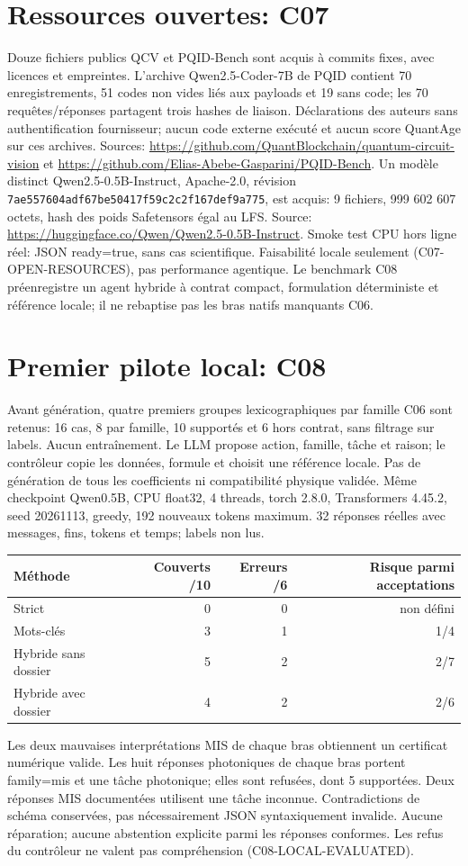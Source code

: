 \documentclass{article}
\begin{document}
\section{Ressources ouvertes: C07}
Douze fichiers publics QCV et PQID-Bench sont acquis à commits fixes,
avec licences et empreintes. L'archive Qwen2.5-Coder-7B de PQID contient
70 enregistrements, 51 codes non vides liés aux payloads et 19 sans code;
les 70 requêtes/réponses partagent trois hashes de liaison.
Déclarations des auteurs sans authentification fournisseur; aucun code
externe exécuté et aucun score QuantAge sur ces archives.
Sources: \url{https://github.com/QuantBlockchain/quantum-circuit-vision} et
\url{https://github.com/Elias-Abebe-Gasparini/PQID-Bench}.
Un modèle distinct Qwen2.5-0.5B-Instruct, Apache-2.0, révision
\texttt{7ae557604adf67be50417f59c2c2f167def9a775}, est acquis:
9 fichiers, 999 602 607 octets, hash des poids Safetensors égal au LFS.
Source: \url{https://huggingface.co/Qwen/Qwen2.5-0.5B-Instruct}.
Smoke test CPU hors ligne réel: JSON ready=true, sans cas scientifique.
Faisabilité locale seulement (C07-OPEN-RESOURCES), pas performance agentique.
Le benchmark C08 préenregistre un agent hybride à contrat compact,
formulation déterministe et référence locale; il ne rebaptise pas les bras
natifs manquants C06.

\section{Premier pilote local: C08}
Avant génération, quatre premiers groupes lexicographiques par famille C06
sont retenus: 16 cas, 8 par famille, 10 supportés et 6 hors contrat, sans filtrage
sur labels. Aucun entraînement. Le LLM propose action, famille, tâche et raison;
le contrôleur copie les données, formule et choisit une référence locale.
Pas de génération de tous les coefficients ni compatibilité physique validée.
Même checkpoint Qwen0.5B, CPU float32, 4 threads, torch 2.8.0,
Transformers 4.45.2, seed 20261113, greedy, 192 nouveaux tokens maximum.
32 réponses réelles avec messages, fins, tokens et temps; labels non lus.

\begin{center}
\begin{tabular}{lrrr}
Méthode & Couverts /10 & Erreurs /6 & Risque parmi acceptations\\ \hline
Strict &0&0&non défini\\
Mots-clés &3&1&1/4\\
Hybride sans dossier &5&2&2/7\\
Hybride avec dossier &4&2&2/6\\ \hline
\end{tabular}
\end{center}
Les deux mauvaises interprétations MIS de chaque bras obtiennent un certificat
numérique valide. Les huit réponses photoniques de chaque bras portent
family=mis et une tâche photonique; elles sont refusées, dont 5 supportées.
Deux réponses MIS documentées utilisent une tâche inconnue. Contradictions de
schéma conservées, pas nécessairement JSON syntaxiquement invalide.
Aucune réparation; aucune abstention explicite parmi les réponses conformes.
Les refus du contrôleur ne valent pas compréhension (C08-LOCAL-EVALUATED).
\end{document}
